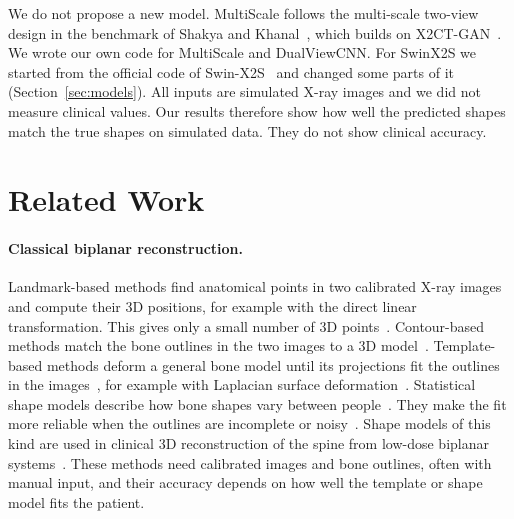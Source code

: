\documentclass[11pt]{article}
\begin{document}
We do not propose a new model. MultiScale follows the multi-scale two-view design in the benchmark of Shakya and Khanal~\cite{shakya2023}, which builds on X2CT-GAN~\cite{ying2019}. We wrote our own code for MultiScale and DualViewCNN. For SwinX2S we started from the official code of Swin-X2S~\cite{liuk2025} and changed some parts of it (Section~\ref{sec:models}). All inputs are simulated X-ray images and we did not measure clinical values. Our results therefore show how well the predicted shapes match the true shapes on simulated data. They do not show clinical accuracy.

\section{Related Work}

\paragraph{Classical biplanar reconstruction.}
Landmark-based methods find anatomical points in two calibrated X-ray images and compute their 3D positions, for example with the direct linear transformation. This gives only a small number of 3D points~\cite{zhang2010}. Contour-based methods match the bone outlines in the two images to a 3D model~\cite{laporte2003}. Template-based methods deform a general bone model until its projections fit the outlines in the images~\cite{gunay2007}, for example with Laplacian surface deformation~\cite{karade2015}. Statistical shape models describe how bone shapes vary between people~\cite{heimann2009}. They make the fit more reliable when the outlines are incomplete or noisy~\cite{zheng2009,baka2011}. Shape models of this kind are used in clinical 3D reconstruction of the spine from low-dose biplanar systems~\cite{humbert2009,melhem2016}. These methods need calibrated images and bone outlines, often with manual input, and their accuracy depends on how well the template or shape model fits the patient.
\end{document}
